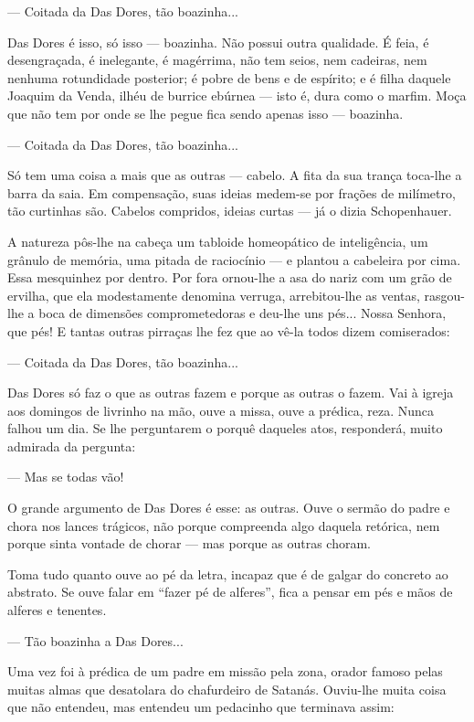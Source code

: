 --- Coitada da Das Dores, tão boazinha...

Das Dores é isso, só isso --- boazinha. Não possui outra qualidade. É
feia, é desengraçada, é inelegante, é magérrima, não tem seios, nem
cadeiras, nem nenhuma rotundidade posterior; é pobre de bens e de
espírito; e é filha daquele Joaquim da Venda, ilhéu de burrice ebúrnea
--- isto é, dura como o marfim. Moça que não tem por onde se lhe pegue
fica sendo apenas isso --- boazinha.

--- Coitada da Das Dores, tão boazinha...

Só tem uma coisa a mais que as outras --- cabelo. A fita da sua trança
toca-lhe a barra da saia. Em compensação, suas ideias medem-se por
frações de milímetro, tão curtinhas são. Cabelos compridos, ideias
curtas --- já o dizia Schopenhauer.

A natureza pôs-lhe na cabeça um tabloide homeopático de inteligência, um
grânulo de memória, uma pitada de raciocínio --- e plantou a cabeleira
por cima. Essa mesquinhez por dentro. Por fora ornou-lhe a asa do nariz
com um grão de ervilha, que ela modestamente denomina verruga,
arrebitou-lhe as ventas, rasgou-lhe a boca de dimensões comprometedoras
e deu-lhe uns pés... Nossa Senhora, que pés! E tantas outras pirraças
lhe fez que ao vê-la todos dizem comiserados:

--- Coitada da Das Dores, tão boazinha...

Das Dores só faz o que as outras fazem e porque as outras o fazem. Vai à
igreja aos domingos de livrinho na mão, ouve a missa, ouve a prédica,
reza. Nunca falhou um dia. Se lhe perguntarem o porquê daqueles atos,
responderá, muito admirada da pergunta:

--- Mas se todas vão!

O grande argumento de Das Dores é esse: as outras. Ouve o sermão do
padre e chora nos lances trágicos, não porque compreenda algo daquela
retórica, nem porque sinta vontade de chorar --- mas porque as outras
choram.

Toma tudo quanto ouve ao pé da letra, incapaz que é de galgar do
concreto ao abstrato. Se ouve falar em ``fazer pé de alferes'', fica a
pensar em pés e mãos de alferes e tenentes.

--- Tão boazinha a Das Dores...

Uma vez foi à prédica de um padre em missão pela zona, orador famoso
pelas muitas almas que desatolara do chafurdeiro de Satanás. Ouviu-lhe
muita coisa que não entendeu, mas entendeu um pedacinho que terminava
assim:

